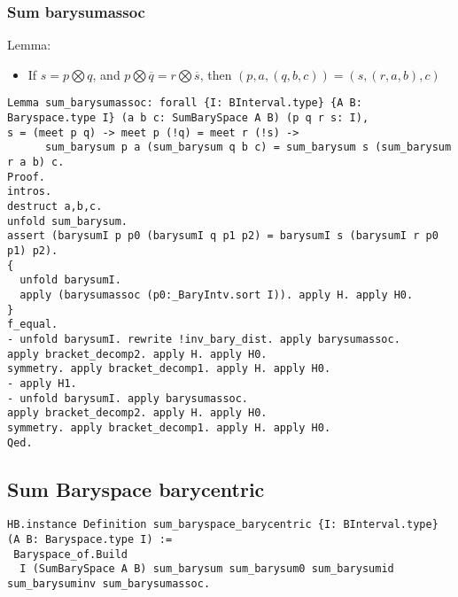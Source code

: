 \documentclass[a4paper,10pt]{article} %
\begin{document}
\subsubsection{Sum barysumassoc}
Lemma:
\begin{itemize}
    \item If $s = p \bigotimes q$, and $p \bigotimes \overline{q} = r \bigotimes \overline{s}$, then $(p, a, (q, b, c)) = (s, (r, a, b), c)$
\end{itemize}
\begin{lstlisting}
Lemma sum_barysumassoc: forall {I: BInterval.type} {A B: Baryspace.type I} (a b c: SumBarySpace A B) (p q r s: I),
s = (meet p q) -> meet p (!q) = meet r (!s) ->  
      sum_barysum p a (sum_barysum q b c) = sum_barysum s (sum_barysum r a b) c.
Proof.
intros.
destruct a,b,c.
unfold sum_barysum. 
assert (barysumI p p0 (barysumI q p1 p2) = barysumI s (barysumI r p0 p1) p2).
{
  unfold barysumI.
  apply (barysumassoc (p0:_BaryIntv.sort I)). apply H. apply H0.
} 
f_equal. 
- unfold barysumI. rewrite !inv_bary_dist. apply barysumassoc.
apply bracket_decomp2. apply H. apply H0.
symmetry. apply bracket_decomp1. apply H. apply H0.
- apply H1.
- unfold barysumI. apply barysumassoc.
apply bracket_decomp2. apply H. apply H0.
symmetry. apply bracket_decomp1. apply H. apply H0.
Qed.
\end{lstlisting}

\subsection{Sum Baryspace barycentric}
\begin{lstlisting}
HB.instance Definition sum_baryspace_barycentric {I: BInterval.type} (A B: Baryspace.type I) := 
 Baryspace_of.Build 
  I (SumBarySpace A B) sum_barysum sum_barysum0 sum_barysumid sum_barysuminv sum_barysumassoc.
\end{lstlisting}
\end{document}

